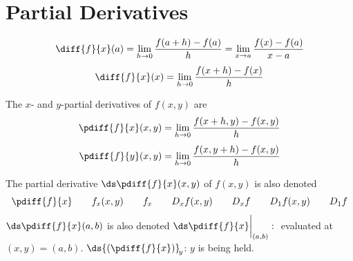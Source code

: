 \section{Partial Derivatives}\label{sec partials}
\begin{equation*}
\diff{f}{x}(a) =\lim_{h\rightarrow 0}\frac{f(a+h) - f(a)}{h}
=\lim_{x\rightarrow a}\frac{f(x) - f(a)}{x-a}
\end{equation*}
\begin{equation*}
\diff{f}{x}(x) =\lim_{h\rightarrow 0}\frac{f(x+h) - f(x)}{h}
\end{equation*}
\begin{defn}\label{def partials}
The $x$- and $y$-partial derivatives of $f(x,y)$ are
\begin{align*}
\pdiff{f}{x}(x,y)
&= \lim_{h\rightarrow 0}\frac{f(x+h,y) - f(x,y)}{h} \\[0.05in]
\pdiff{f}{y}(x,y)
&= \lim_{h\rightarrow 0}\frac{f(x,y+h) - f(x,y)}{h}
\end{align*}
\end{defn}
\begin{notn}\label{notn partial}
The partial derivative $\ds\pdiff{f}{x}(x,y)$ of $f(x,y)$ is also denoted
\begin{equation*}
\pdiff{f}{x}\qquad
f_x(x,y)\qquad
f_x\qquad
D_xf(x,y)\qquad
D_xf\qquad
D_1 f(x,y)\qquad
D_1 f
\end{equation*}
$\ds\pdiff{f}{x}(a,b)$ is also denoted
$\ds\pdiff{f}{x}\bigg|_{(a,b)}:\;$ evaluated at $(x,y)=(a,b)$.
$\ds{\left(\pdiff{f}{x}\right)}_{\!y}$: $y$ is being held.%
\end{notn}
